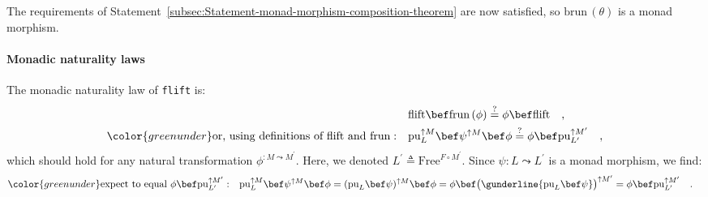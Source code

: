 The requirements of Statement~\ref{subsec:Statement-monad-morphism-composition-theorem}
are now satisfied, so $\text{brun}\,(\theta)$ is a monad morphism.


\paragraph{Monadic naturality laws}

The monadic naturality law of \lstinline!flift! is:
\begin{align*}
 & \text{flift}\bef\text{frun}\,(\phi)\overset{?}{=}\phi\bef\text{flift}\quad,\\
{\color{greenunder}\text{or, using definitions of }\text{flift}\text{ and }\text{frun}:}\quad & \text{pu}_{L}^{\uparrow M}\bef\psi^{\uparrow M}\bef\phi\overset{?}{=}\phi\bef\text{pu}_{L^{\prime}}^{\uparrow M^{\prime}}\quad,
\end{align*}
which should hold for any natural transformation $\phi^{:M\leadsto M^{\prime}}$.
Here, we denoted $L^{\prime}\triangleq\text{Free}^{F\circ M^{\prime}}$.
Since $\psi:L\leadsto L^{\prime}$ is a monad morphism, we find:
\begin{align*}
{\color{greenunder}\text{expect to equal }\phi\bef\text{pu}_{L^{\prime}}^{\uparrow M^{\prime}}:}\quad & \text{pu}_{L}^{\uparrow M}\bef\psi^{\uparrow M}\bef\phi=(\text{pu}_{L}\bef\psi)^{\uparrow M}\bef\phi=\phi\bef\big(\gunderline{\text{pu}_{L}\bef\psi}\big)^{\uparrow M^{\prime}}=\phi\bef\text{pu}_{L^{\prime}}^{\uparrow M^{\prime}}\quad.
\end{align*}

